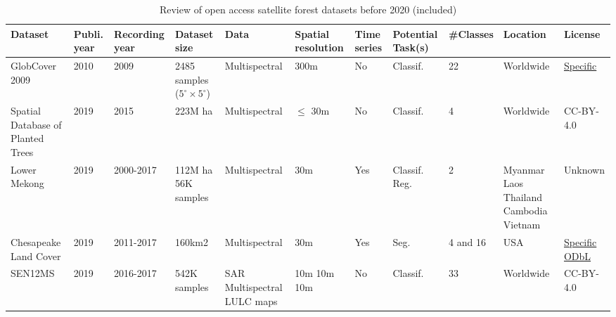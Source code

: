 \documentclass{CUP-JNL-DTM}%
\theoremstyle{definition}
\numberwithin{equation}{section}
\begin{document}
\begin{table*}[ht]
\fontsize{6.5pt}{7.5pt}\selectfont %
\renewcommand{\arraystretch}{1.5} %
\setlength\tabcolsep{5pt} %
\caption{Review of open access satellite forest datasets before 2020 (included)}
{\begin{fntable}
\centering
\begin{tabular}{p{1.5cm} | p{0.4cm} | p{1cm} | p{1.3cm} | p{1.2cm} : p{1cm} | p{0.4cm} | p{0.7cm} | p{0.8cm} | p{1cm} | p{1.1cm}}
\toprule
Dataset  & Publi. year & Recording year & Dataset size & Data  & Spatial resolution & Time series & Potential Task(s) & \#Classes & Location  & License  \\
\midrule

GlobCover 2009	\cite{arino_olivier_global_2010} & 2010 & 2009 & 2485 samples \newline ($5^{\circ} \times 5^{\circ}$) & Multispectral & 300m & No & Classif. & 22 & Worldwide & \href{http://due.esrin.esa.int/page_globcover.php}{Specific} \\

Spatial Database of Planted Trees \cite{harris_spatial_2019} & 2019 & 2015 & 223M ha & Multispectral & $\leq$ 30m & No & Classif. & 4 & Worldwide & CC-BY-4.0 \\

Lower Mekong \cite{potapov_annual_2019} & 2019 & 2000-2017 & 112M ha \newline 56K samples & Multispectral & 30m & Yes & Classif. \newline Reg. & 2 & Myanmar \newline Laos \newline Thailand \newline Cambodia \newline Vietnam & Unknown \\

Chesapeake Land Cover \cite{robinson_large_2019} & 2019 & 2011-2017 & 160km2 & Multispectral & 30m & Yes & Seg. & 4 and 16 & USA & \href{https://www.usgs.gov/information-policies-and-instructions/copyrights-and-credits}{Specific} \newline \href{https://opendatacommons.org/licenses/odbl/}{ODbL} \\

SEN12MS	\cite{schmitt_sen12ms_2019} & 2019 & 2016-2017 & 542K samples & SAR \newline Multispectral \newline LULC maps & 10m \newline 10m \newline 10m & No & Classif. & 33 & Worldwide & CC-BY-4.0 \\


\end{tabular}
\end{fntable}}
\end{table*}
\end{document}
